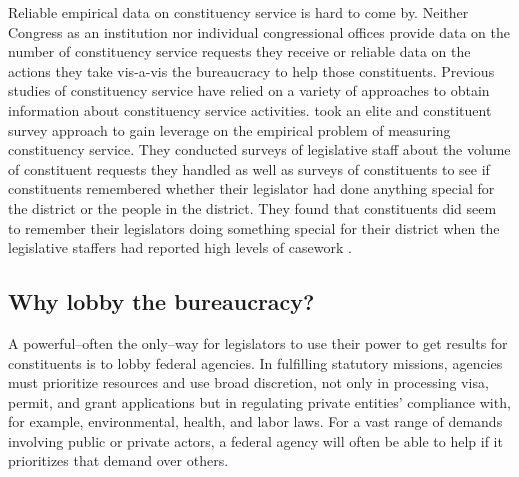 \documentclass{article}
\begin{document}
Reliable empirical data on constituency service is hard to come by.  Neither Congress as an institution nor individual congressional offices provide data on the number of constituency service requests they receive or reliable data on the actions they take vis-a-vis the bureaucracy to help those constituents.  Previous studies of constituency service have relied on a variety of approaches to obtain information about constituency service activities.  \citet*{CainFerejohnFiorina1987} took an elite and constituent survey approach to gain leverage on the empirical problem of measuring constituency service.  They conducted surveys of legislative staff about the volume of constituent requests they handled as well as surveys of constituents to see if constituents remembered whether their legislator had done anything special for the district or the people in the district.  They found that constituents did seem to remember their legislators doing something special for their district when the legislative staffers had reported high levels of casework \citep{CainFerejohnFiorina1987}.  






\subsection{Why lobby the bureaucracy? }
A powerful--often the only--way for legislators to use their power to get results for constituents is to lobby federal agencies. In fulfilling statutory missions, agencies must prioritize resources and use broad discretion, not only in processing visa, permit, and grant applications but in regulating private entities' compliance with, for example, environmental, health, and labor laws. For a vast range of demands involving public or private actors, a federal agency will often be able to help if it prioritizes that demand over others. 
\end{document}
